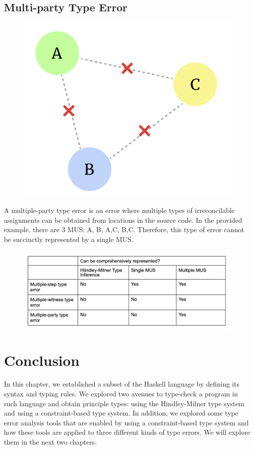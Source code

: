 \subsection{Multi-party Type Error}
\begin{figure}[hbt]
  \includegraphics[width=0.5\linewidth]{Multi-party}
  \caption{}
\end{figure}

A multiple-party type error is an error where multiple types of irreconcilable assignments can be obtained from locations in the source code. In the provided example, there are 3 MUS: {A, B}, {A,C}, {B,C}. Therefore, this type of error cannot be succinctly represented by a single MUS.

\begin{figure}[hbt]
  \includegraphics[width=\linewidth]{Compare}
  \caption{}
\end{figure}

\section{Conclusion}
In this chapter, we established a subset of the Haskell language by defining its syntax and typing rules. We explored two avenues to type-check a program in such language and obtain principle types: using the Hindley-Milner type system and using a constraint-based type system. In addition, we explored some type error analysis tools that are enabled by using a constraint-based type system and how these tools are applied to three different kinds of type errors. We will explore them in the next two chapters.
